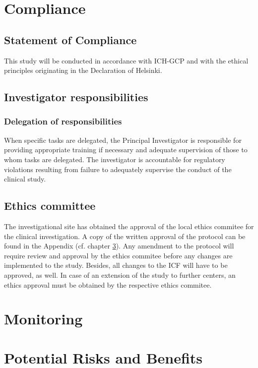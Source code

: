 \section{Compliance}
\subsection{Statement of Compliance}
This study will be conducted in accordance with ICH-GCP and with the ethical principles originating in the Declaration of Helsinki. 

\subsection{Investigator responsibilities}

\subsubsection{Delegation of responsibilities}
When specific tasks are delegated, the Principal Investigator is responsible for providing appropriate training if necessary and adequate supervision of those to whom tasks are delegated. The investigator is accountable for regulatory violations resulting from failure to adequately supervise the conduct of the clinical study. 

\subsection{Ethics committee}
The investigational site has obtained the approval of the local ethics commitee for the clinical investigation. A copy of the written approval of the protocol can be found in the Appendix (cf. chapter \ref{}). Any amendment to the protocol will require review and approval by the ethics commitee before any changes are implemented to the study. Besides, all changes to the \ac{ICF} will have to be approved, as well. In case of an extension of the study to further centers, an ethics approval must be obtained by the respective ethics commitee. 

\section{Monitoring}

\section{Potential Risks and Benefits}

